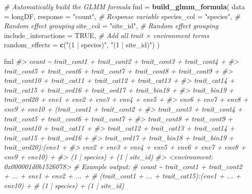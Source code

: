 \documentclass[
]{article}
\newenvironment{Shaded}{\begin{snugshade}}{\end{snugshade}}
\newcommand{\AttributeTok}[1]{\textcolor[rgb]{0.13,0.29,0.53}{#1}}
\newcommand{\CommentTok}[1]{\textcolor[rgb]{0.56,0.35,0.01}{\textit{#1}}}
\newcommand{\ConstantTok}[1]{\textcolor[rgb]{0.56,0.35,0.01}{#1}}
\newcommand{\FunctionTok}[1]{\textcolor[rgb]{0.13,0.29,0.53}{\textbf{#1}}}
\newcommand{\NormalTok}[1]{#1}
\newcommand{\OtherTok}[1]{\textcolor[rgb]{0.56,0.35,0.01}{#1}}
\newcommand{\StringTok}[1]{\textcolor[rgb]{0.31,0.60,0.02}{#1}}
\begin{document}
\begin{Shaded}
\begin{Highlighting}[]
\CommentTok{\# Automatically build the GLMM formula}
\NormalTok{fml }\OtherTok{=} \FunctionTok{build\_glmm\_formula}\NormalTok{(}
  \AttributeTok{data                 =}\NormalTok{ longDF,}
  \AttributeTok{response             =} \StringTok{"count"}\NormalTok{,            }\CommentTok{\# Response variable}
  \AttributeTok{species\_col          =} \StringTok{"species"}\NormalTok{,          }\CommentTok{\# Random effect grouping}
  \AttributeTok{site\_col             =} \StringTok{"site\_id"}\NormalTok{,          }\CommentTok{\# Random effect grouping}
  \AttributeTok{include\_interactions =} \ConstantTok{TRUE}\NormalTok{,               }\CommentTok{\# Add all trait × environment terms}
  \AttributeTok{random\_effects       =} \FunctionTok{c}\NormalTok{(}\StringTok{"(1 | species)"}\NormalTok{, }\StringTok{"(1 | site\_id)"}\NormalTok{)}
\NormalTok{)}

\NormalTok{fml}
\CommentTok{\#\textgreater{} count \textasciitilde{} trait\_cont1 + trait\_cont2 + trait\_cont3 + trait\_cont4 + }
\CommentTok{\#\textgreater{}     trait\_cont5 + trait\_cont6 + trait\_cont7 + trait\_cont8 + trait\_cont9 + }
\CommentTok{\#\textgreater{}     trait\_cont10 + trait\_cat11 + trait\_cat12 + trait\_cat13 + }
\CommentTok{\#\textgreater{}     trait\_cat14 + trait\_cat15 + trait\_ord16 + trait\_ord17 + trait\_bin18 + }
\CommentTok{\#\textgreater{}     trait\_bin19 + trait\_ord20 + env1 + env2 + env3 + env4 + env5 + }
\CommentTok{\#\textgreater{}     env6 + env7 + env8 + env9 + env10 + (trait\_cont1 + trait\_cont2 + }
\CommentTok{\#\textgreater{}     trait\_cont3 + trait\_cont4 + trait\_cont5 + trait\_cont6 + trait\_cont7 + }
\CommentTok{\#\textgreater{}     trait\_cont8 + trait\_cont9 + trait\_cont10 + trait\_cat11 + }
\CommentTok{\#\textgreater{}     trait\_cat12 + trait\_cat13 + trait\_cat14 + trait\_cat15 + trait\_ord16 + }
\CommentTok{\#\textgreater{}     trait\_ord17 + trait\_bin18 + trait\_bin19 + trait\_ord20):(env1 + }
\CommentTok{\#\textgreater{}     env2 + env3 + env4 + env5 + env6 + env7 + env8 + env9 + env10) + }
\CommentTok{\#\textgreater{}     (1 | species) + (1 | site\_id)}
\CommentTok{\#\textgreater{} \textless{}environment: 0x000001d0b1526078\textgreater{}}
\CommentTok{\# Example output:}
\CommentTok{\# count \textasciitilde{} trait\_cont1 + trait\_cont2 + ... + env1 + env2 + ... +}
\CommentTok{\#         (trait\_cont1 + ... + trait\_cat15):(env1 + ... + env10) +}
\CommentTok{\#         (1 | species) + (1 | site\_id)}
\end{Highlighting}
\end{Shaded}
\end{document}
